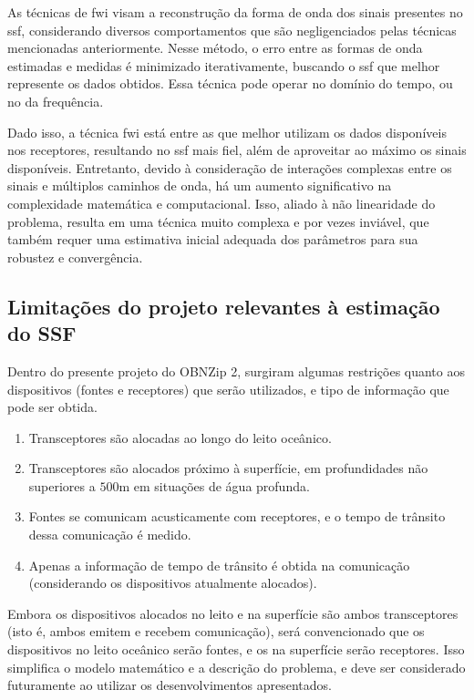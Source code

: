 As técnicas de \gls{fwi} \cite{virieux_overview_2009,fichtner_multiscale_2013} visam a reconstrução da forma de onda dos sinais presentes no \gls{ssf}, considerando diversos comportamentos que são negligenciados pelas técnicas mencionadas anteriormente. Nesse método, o erro entre as formas de onda estimadas e medidas é minimizado iterativamente, buscando o \gls{ssf} que melhor represente os dados obtidos. Essa técnica pode operar no domínio do tempo, ou no da frequência.

Dado isso, a técnica \gls{fwi} está entre as que melhor utilizam os dados disponíveis nos receptores, resultando no \gls{ssf} mais fiel, além de aproveitar ao máximo os sinais disponíveis. Entretanto, devido à consideração de interações complexas entre os sinais e múltiplos caminhos de onda, há um aumento significativo na complexidade matemática e computacional. Isso, aliado à não linearidade do problema, resulta em uma técnica muito complexa e por vezes inviável, que também requer uma estimativa inicial adequada dos parâmetros para sua robustez e convergência.

\subsection{Limitações do projeto relevantes à estimação do SSF}

Dentro do presente projeto do OBNZip 2, surgiram algumas restrições quanto aos dispositivos (fontes e receptores) que serão utilizados, e tipo de informação que pode ser obtida.

\begin{enumerate}[itemsep=0pt]
	\item Transceptores são alocadas ao longo do leito oceânico.
	\item Transceptores são alocados próximo à superfície, em profundidades não superiores a $500\si{\meter}$ em situações de água profunda.
	\item Fontes se comunicam acusticamente com receptores, e o tempo de trânsito dessa comunicação é medido.
	\item Apenas a informação de tempo de trânsito é obtida na comunicação (considerando os dispositivos atualmente alocados).
\end{enumerate}

Embora os dispositivos alocados no leito e na superfície são ambos transceptores (isto é, ambos emitem e recebem comunicação), será convencionado que os dispositivos no leito oceânico serão \gls{fontes}, e os na superfície serão \gls{receptores}. Isso simplifica o modelo matemático e a descrição do problema, e deve ser considerado futuramente ao utilizar os desenvolvimentos apresentados.


